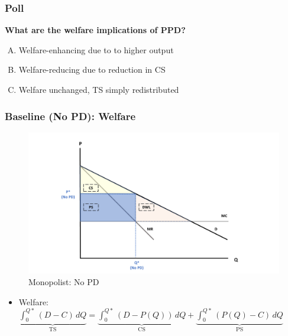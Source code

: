 \documentclass[10pt]{beamer}
\begin{document}
\begin{frame} 
	\frametitle{Poll}
	
	\begin{center}
		\textbf{What are the welfare implications of PPD?}
	\end{center}	
	
	\begin{enumerate}[(A)]
	\item Welfare-enhancing due to to higher output
	\item Welfare-reducing due to reduction in CS
	\item Welfare unchanged, TS simply redistributed 
\end{enumerate}

		
\end{frame}

\begin{frame} 
	\frametitle{Baseline (No PD): Welfare}
	

	\begin{figure}[H]
		\centering
		\includegraphics[width=0.78\linewidth]{no_pd_welf}
		\caption{Monopolist: No PD \\ 
			\label{fig:ppd}}
		
	\end{figure}
	
	\begin{itemize}
		\item Welfare: $\underbrace{\int_{0}^{Q*} (D - C) \,dQ}_\text{TS} = \underbrace{\int_{0}^{Q*} (D - P(Q)) \,dQ}_\text{CS} + \underbrace{\int_{0}^{Q*} (P(Q) - C)\,dQ }_\text{PS}$
	\end{itemize}
	
	
\end{frame}
\end{document}
